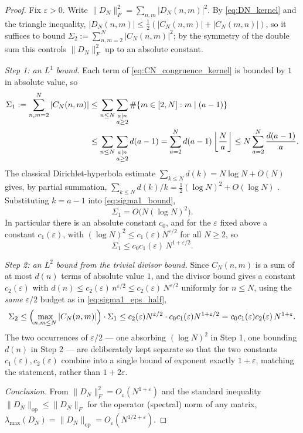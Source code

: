\documentclass[11pt]{amsart}
\numberwithin{equation}{section}
\theoremstyle{plain}
\theoremstyle{definition}
\theoremstyle{remark}
\newcommand{\eps}{\varepsilon}
\begin{document}
\begin{proof}
Fix $\eps>0$.  Write $\|D_N\|_F^2=\sum_{n,m}|D_N(n,m)|^2$.  By \eqref{eq:DN_kernel} and the triangle inequality, $|D_N(n,m)|\le\tfrac12(|C_N(n,m)|+|C_N(m,n)|)$, so it suffices to bound $\Sigma_2:=\sum_{n,m=2}^N|C_N(n,m)|^2$; by the symmetry of the double sum this controls $\|D_N\|_F^2$ up to an absolute constant.

\emph{Step 1: an $L^1$ bound.}  Each term of \eqref{eq:CN_congruence_kernel} is bounded by $1$ in absolute value, so
\begin{align}
\Sigma_1:=\sum_{n,m=2}^N|C_N(n,m)|
&\le\sum_{n\le N}\sum_{\substack{a\mid n\\a\ge2}}\#\{m\in[2,N]:m\mid(a-1)\}\notag\\
&\le\sum_{n\le N}\sum_{\substack{a\mid n\\a\ge2}}d(a-1)
=\sum_{a=2}^{N}d(a-1)\left\lfloor\frac Na\right\rfloor
\le N\sum_{a=2}^{N}\frac{d(a-1)}a.
\label{eq:sigma1_bound}
\end{align}
The classical Dirichlet-hyperbola estimate $\sum_{k\le N}d(k)=N\log N+O(N)$ gives, by partial summation, $\sum_{k\le N}d(k)/k=\tfrac12(\log N)^2+O(\log N)$ \cite{Apostol1976}.  Substituting $k=a-1$ into \eqref{eq:sigma1_bound},
\begin{equation}
\Sigma_1=O\bigl(N(\log N)^2\bigr).
\label{eq:sigma1_final}
\end{equation}
In particular there is an absolute constant $c_0$, and for the $\eps$ fixed above a constant $c_1(\eps)$, with $(\log N)^2\le c_1(\eps)N^{\eps/2}$ for all $N\ge2$, so
\begin{equation}
\Sigma_1\le c_0c_1(\eps)\,N^{1+\eps/2}.
\label{eq:sigma1_eps_half}
\end{equation}

\emph{Step 2: an $L^2$ bound from the trivial divisor bound.}  Since $C_N(n,m)$ is a sum of at most $d(n)$ terms of absolute value $1$, and the divisor bound gives a constant $c_2(\eps)$ with $d(n)\le c_2(\eps)\,n^{\eps/2}\le c_2(\eps)\,N^{\eps/2}$ uniformly for $n\le N$, using the \emph{same} $\eps/2$ budget as in \eqref{eq:sigma1_eps_half},
\begin{equation}
\Sigma_2\le\Bigl(\max_{n,m\le N}|C_N(n,m)|\Bigr)\cdot\Sigma_1
\le c_2(\eps)N^{\eps/2}\cdot c_0c_1(\eps)N^{1+\eps/2}
=c_0c_1(\eps)c_2(\eps)\,N^{1+\eps}.
\label{eq:sigma2_final}
\end{equation}
The two occurrences of $\eps/2$ --- one absorbing $(\log N)^2$ in Step 1, one bounding $d(n)$ in Step 2 --- are deliberately kept separate so that the two constants $c_1(\eps),c_2(\eps)$ combine into a single bound of exponent exactly $1+\eps$, matching the statement, rather than $1+2\eps$.

\emph{Conclusion.}  From $\|D_N\|_F^2=O_\eps(N^{1+\eps})$ and the standard inequality $\|D_N\|_{\mathrm{op}}\le\|D_N\|_F$ for the operator (spectral) norm of any matrix, $\lambda_{\max}(D_N)=\|D_N\|_{\mathrm{op}}=O_\eps(N^{1/2+\eps})$.
\end{proof}
\end{document}
